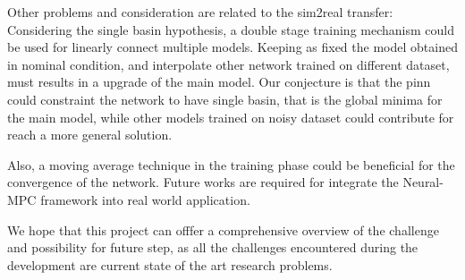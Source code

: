 Other problems and consideration are related to the sim2real transfer:
Considering the single basin hypothesis, a double stage training mechanism could be used for linearly connect multiple models. 
Keeping as fixed the model obtained in nominal condition, and interpolate other network trained on different dataset, must results in a upgrade of the 
main model. Our conjecture is that the pinn could constraint the network to have single basin, that is the global minima for the main model, while 
other models trained on noisy dataset could contribute for reach a more general solution.

Also, a moving average technique in the training phase could be beneficial for the convergence of the network.
Future works are required for integrate the Neural-MPC framework into real world application. 

We hope that this project can offfer a comprehensive overview of the challenge and possibility for future step, as all the challenges encountered during the development 
are current state of the art research problems. 